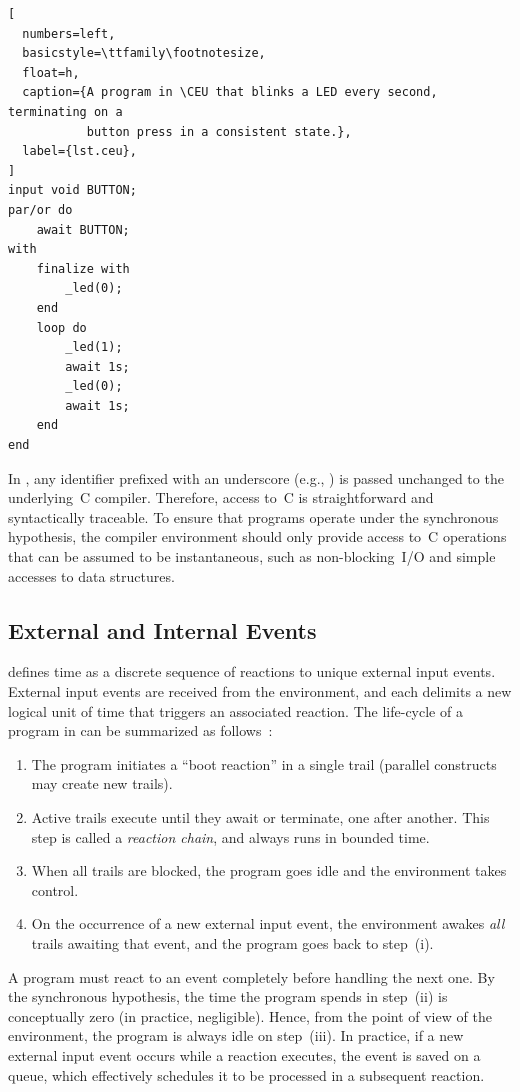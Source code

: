 \begin{lstlisting}[
  numbers=left,
  basicstyle=\ttfamily\footnotesize,
  float=h,
  caption={A program in \CEU that blinks a LED every second, terminating on a
           button press in a consistent state.},
  label={lst.ceu},
]
input void BUTTON;
par/or do
    await BUTTON;
with
    finalize with
        _led(0);
    end
    loop do
        _led(1);
        await 1s;
        _led(0);
        await 1s;
    end
end
\end{lstlisting}

In \CEU, any identifier prefixed with an underscore (e.g., ) is
passed unchanged to the underlying~C compiler.
%
Therefore, access to~C is straightforward and syntactically traceable.
%
To ensure that programs operate under the synchronous hypothesis, the compiler
environment should only provide access to~C operations that can be assumed to
be instantaneous, such as non-blocking~I/O and simple accesses to data
structures.

\subsection{External and Internal Events}
\label{sec.ceu.evts}

\CEU defines time as a discrete sequence of reactions to unique external
input events.
%
External input events are received from the environment, and each delimits a
new logical unit of time that triggers an associated reaction.
%
The life-cycle of a program in \CEU can be summarized as
follows~\cite{ceu.sensys13}:
%
\begin{enumerate}[i]
\item The program initiates a ``boot reaction'' in a single trail (parallel
      constructs may create new trails).
\item Active trails execute until they await or terminate, one after
      another.  This step is called a \emph{reaction chain}, and always runs in
      bounded time.
\item When all trails are blocked, the program goes idle and the environment
      takes control.
\item On the occurrence of a new external input event, the environment
      awakes \emph{all} trails awaiting that event, and the program goes back to
      step~(i).
\end{enumerate}

A program must react to an event completely before handling the next one.
%
By the synchronous hypothesis, the time the program spends in step~(ii) is
conceptually zero (in practice, negligible).
%
Hence, from the point of view of the environment, the program is always
idle on step~(iii).
%
In practice, if a new external input event occurs while a reaction executes,
the event is saved on a queue, which effectively schedules it to be processed
in a subsequent reaction.

